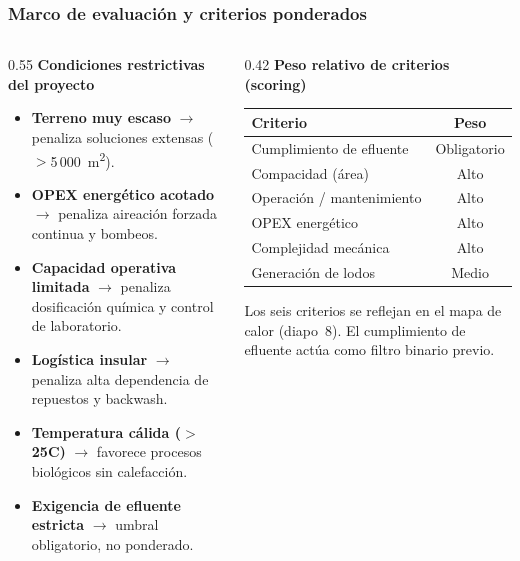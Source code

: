 \documentclass[aspectratio=169]{beamer}
\begin{document}
\begin{frame}
\frametitle{Marco de evaluaci\'{o}n y criterios ponderados}
\begin{columns}[T]
\begin{column}{0.55\textwidth}
\textbf{Condiciones restrictivas del proyecto}\\[4pt]
\scriptsize
\begin{itemize}
\setlength{\itemsep}{1pt}
\setlength{\topsep}{2pt}
\item \textbf{Terreno muy escaso} $\rightarrow$ penaliza soluciones extensas ($>$5\,000~m\textsuperscript{2}).
\item \textbf{OPEX energ\'{e}tico acotado} $\rightarrow$ penaliza aireaci\'{o}n forzada continua y bombeos.
\item \textbf{Capacidad operativa limitada} $\rightarrow$ penaliza dosificaci\'{o}n qu\'{i}mica y control de laboratorio.
\item \textbf{Log\'{i}stica insular} $\rightarrow$ penaliza alta dependencia de repuestos y backwash.
\item \textbf{Temperatura c\'{a}lida ($>$25\textdegree C)} $\rightarrow$ favorece procesos biol\'{o}gicos sin calefacci\'{o}n.
\item \textbf{Exigencia de efluente estricta} $\rightarrow$ umbral obligatorio, no ponderado.
\end{itemize}
\end{column}
\begin{column}{0.42\textwidth}
\textbf{Peso relativo de criterios (scoring)}\\[4pt]
\scriptsize
\renewcommand{\arraystretch}{1.0}
\begin{tabular}{lc}
\toprule
Criterio & Peso \\
\midrule
Cumplimiento de efluente & Obligatorio \\
Compacidad (\'{a}rea) & Alto \\
Operaci\'{o}n / mantenimiento & Alto \\
OPEX energ\'{e}tico & Alto \\
Complejidad mec\'{a}nica & Alto \\
Generaci\'{o}n de lodos & Medio \\
\bottomrule
\end{tabular}
\vspace{4pt}

\scriptsize
Los seis criterios se reflejan en el mapa de calor (diapo~8). El cumplimiento de efluente act\'{u}a como filtro binario previo.
\end{column}
\end{columns}
\end{frame}
\end{document}
